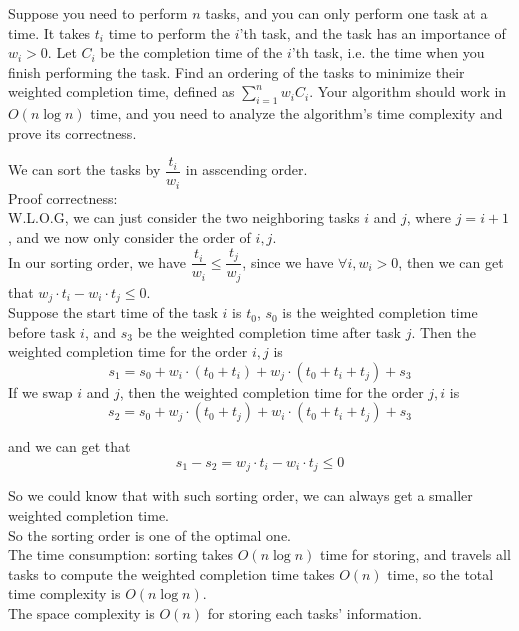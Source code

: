 \problem{}
Suppose you need to perform $n$ tasks, and you can only perform one task at a time.  It takes $t_i$ time to perform the $i$'th task, and the task has an importance of $w_i > 0$.  Let $C_i$ be the completion time of the $i$'th task, i.e. the time when you finish performing the task.  Find an ordering of the tasks to minimize their weighted completion time, defined as $\sum_{i=1}^{n} w_i  C_i$.  Your algorithm should work in $O(n\log{n})$ time, and you need to analyze the algorithm's time complexity and prove its correctness. 

\solution{}
We can sort the tasks by $\dfrac{t_i}{w_i}$ in asscending order.\\

Proof correctness:\\
W.L.O.G, we can just consider the two neighboring tasks $i$ and $j$, where $j=i+1$, and we now only consider the order of $i,j$.\\
In our sorting order, we have $\dfrac{t_i}{w_i}\leq\dfrac{t_j}{w_j}$, since we have $\forall i,w_i>0$, then we can get that $ w_j\cdot t_i - w_i\cdot t_j \leq 0$.\\
Suppose the start time of the task $i$ is $t_0$, $s_0$ is the weighted completion time before task $i$, and $s_3$ be the weighted completion time after task $j$.
Then the weighted completion time for the order $i,j$ is
$$s_1=s_0+w_i\cdot(t_0+t_i)+w_j\cdot(t_0+t_i+t_j)+s_3$$
If we swap $i$ and $j$, then the weighted completion time for the order $j,i$ is
$$s_2=s_0+w_j\cdot(t_0+t_j)+w_i\cdot(t_0+t_i+t_j)+s_3$$

and we can get that
$$s_1-s_2 = w_j\cdot t_i - w_i\cdot t_j \leq 0$$

So we could know that with such sorting order, we can always get a smaller weighted completion time.\\
So the sorting order is one of the optimal one.\\

The time consumption: sorting takes $O(n\log n)$ time for storing, and travels all tasks to compute the weighted completion time takes $O(n)$ time,
so the total time complexity is $O(n\log n)$.\\
The space complexity is $O(n)$ for storing each tasks' information.\\

\newpage
